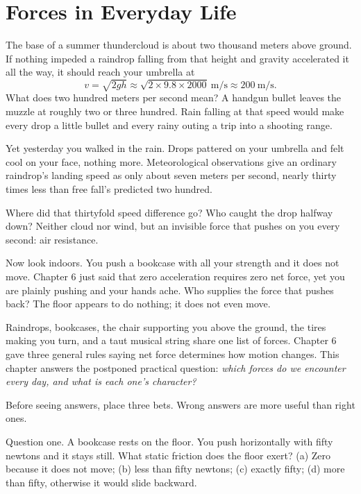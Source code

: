\chapter{Forces in Everyday Life}


\begin{mainline}
The base of a summer thundercloud is about two thousand meters above ground. If nothing impeded a raindrop falling from that height and gravity accelerated it all the way, it should reach your umbrella at
\[
v=\sqrt{2gh}\approx\sqrt{2\times9.8\times2000}\ \text{m/s}\approx 200\ \text{m/s}.
\]
What does two hundred meters per second mean? A handgun bullet leaves the muzzle at roughly two or three hundred. Rain falling at that speed would make every drop a little bullet and every rainy outing a trip into a shooting range.

Yet yesterday you walked in the rain. Drops pattered on your umbrella and felt cool on your face, nothing more. Meteorological observations give an ordinary raindrop's landing speed as only about seven meters per second, nearly thirty times less than free fall's predicted two hundred.

Where did that thirtyfold speed difference go? Who caught the drop halfway down? Neither cloud nor wind, but an invisible force that pushes on you every second: air resistance.

Now look indoors. You push a bookcase with all your strength and it does not move. Chapter 6 just said that zero acceleration requires zero net force, yet you are plainly pushing and your hands ache. Who supplies the force that pushes back? The floor appears to do nothing; it does not even move.

Raindrops, bookcases, the chair supporting you above the ground, the tires making you turn, and a taut musical string share one list of forces. Chapter 6 gave three general rules saying net force determines how motion changes. This chapter answers the postponed practical question: \emph{which forces do we encounter every day, and what is each one's character?}
\end{mainline}


Before seeing answers, place three bets. Wrong answers are more useful than right ones.

Question one. A bookcase rests on the floor. You push horizontally with fifty newtons and it stays still. What static friction does the floor exert? (a) Zero because it does not move; (b) less than fifty newtons; (c) exactly fifty; (d) more than fifty, otherwise it would slide backward.

